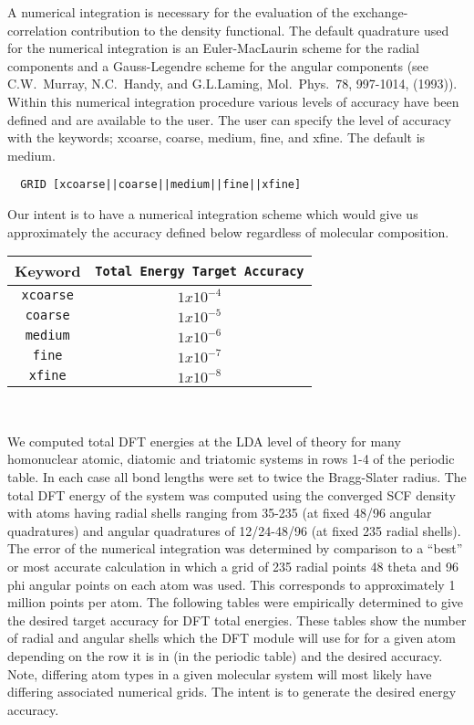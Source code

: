 A numerical integration is necessary for the evaluation of the
exchange-correlation contribution to the density functional.  The
default quadrature used for the numerical integration is an
Euler-MacLaurin scheme for the radial components and a Gauss-Legendre
scheme for the angular components (see C.W.~Murray, N.C.~Handy, and
G.L.Laming, Mol.~Phys.~78, 997-1014, (1993)).  Within this numerical
integration procedure various levels of accuracy have been defined and
are available to the user.  The user can specify the level of accuracy
with the keywords; xcoarse, coarse, medium, fine, and xfine.  The
default is medium.

\begin{verbatim}
  GRID [xcoarse||coarse||medium||fine||xfine]
\end{verbatim}

Our intent is to have a numerical integration scheme which would give
us approximately the accuracy defined below regardless of molecular
composition.  
\begin{center}
  \begin{tabular}[right]{|c|c|} \hline
Keyword & {\tt Total Energy Target Accuracy} \\ \hline
{\tt xcoarse} & $1x10^{-4}$ \\ \hline
{\tt coarse}  & $1x10^{-5}$ \\ \hline
{\tt medium}  & $1x10^{-6}$ \\ \hline
{\tt fine}    & $1x10^{-7}$ \\ \hline
{\tt xfine}   & $1x10^{-8}$ \\ \hline
  \end{tabular} \\
\end{center}

We computed total DFT energies at the LDA level of theory for many
homonuclear atomic, diatomic and triatomic systems in rows 1-4 of the
periodic table.  In each case all bond lengths were set to twice the
Bragg-Slater radius.  The total DFT energy of the system was computed
using the converged SCF density with atoms having radial shells
ranging from 35-235 (at fixed 48/96 angular quadratures) and angular
quadratures of 12/24-48/96 (at fixed 235 radial shells).  The error of
the numerical integration was determined by comparison to a ``best''
or most accurate calculation in which a grid of 235 radial points 48
theta and 96 phi angular points on each atom was used.  This
corresponds to approximately 1 million points per atom.  The following
tables were empirically determined to give the desired target accuracy
for DFT total energies.  These tables show the number of radial and
angular shells which the DFT module will use for for a given atom
depending on the row it is in (in the periodic table) and the desired
accuracy.  Note, differing atom types in a given molecular system will
most likely have differing associated numerical grids.  The intent is
to generate the desired energy accuracy.

